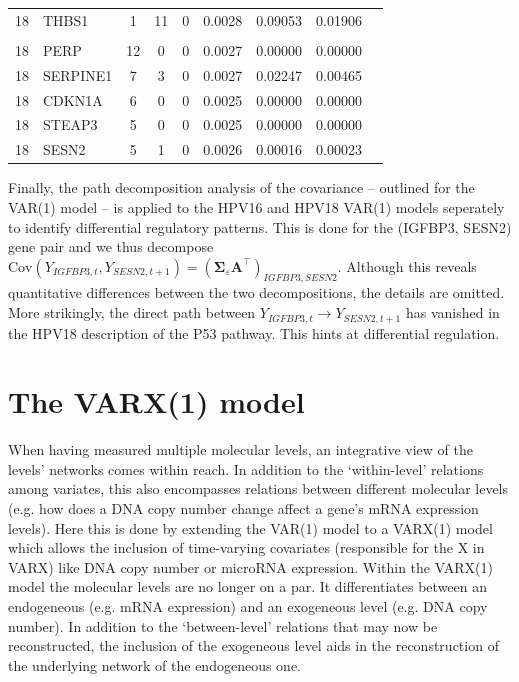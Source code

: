 {\begin{table}
\begin{tabular}{ll*{6}{c}r}
18 & THBS1     & 1 & 11 & 0 & 0.0028 & 0.09053 & 0.01906
\\
\\
18 & PERP    & 12 & 0 & 0 & 0.0027 & 0.00000 & 0.00000
\\
18 & SERPINE1        & 7 & 3 & 0 & 0.0027 & 0.02247 & 0.00465
\\
18 & CDKN1A       & 6 & 0 & 0 & 0.0025 & 0.00000 & 0.00000
\\
18 & STEAP3 & 5 & 0 & 0 & 0.0025 & 0.00000 & 0.00000
\\
18 & SESN2  & 5 & 1 & 0 & 0.0026 & 0.00016 & 0.00023
\\
\hline
\hline
\end{tabular}
\label{table:postEstNodeStats}
\end{table}


Finally, the path decomposition analysis of the covariance -- outlined for the VAR(1) model -- is applied to the HPV16 and HPV18 VAR(1) models seperately to identify differential regulatory patterns. This is done for the (IGFBP3, SESN2) gene pair and we thus decompose $\mbox{Cov}(Y_{IGFBP3,t}, Y_{SESN2,t+1}) = (\mathbf{\Sigma}_{\varepsilon} \mathbf{A}^{\top})_{IGFBP3,SESN2}$. Although this reveals quantitative differences between the two decompositions, the details are omitted. More strikingly, the direct path between $Y_{IGFBP3,t}\rightarrow Y_{SESN2,t+1}$ has vanished in the HPV18 description of the P53 pathway. This hints at differential regulation.

\section{The VARX(1) model} 
When having measured multiple molecular levels, an integrative view of the levels' networks  comes within reach. In addition to the `within-level' relations among variates, this also encompasses relations between different molecular levels (e.g. how does a DNA copy number change affect a gene's mRNA expression levels). Here this is done by extending the VAR(1) model to a VARX(1) model which allows the inclusion of time-varying covariates (responsible for the X in VARX) like DNA copy number or microRNA expression. Within the VARX(1) model the molecular levels are no longer on a par. It differentiates between an endogeneous (e.g. mRNA expression) and an exogeneous level (e.g. DNA copy number). In addition to the `between-level' relations that may now be reconstructed, the inclusion of the exogeneous level aids in the reconstruction of the underlying network of the endogeneous one. 

}
